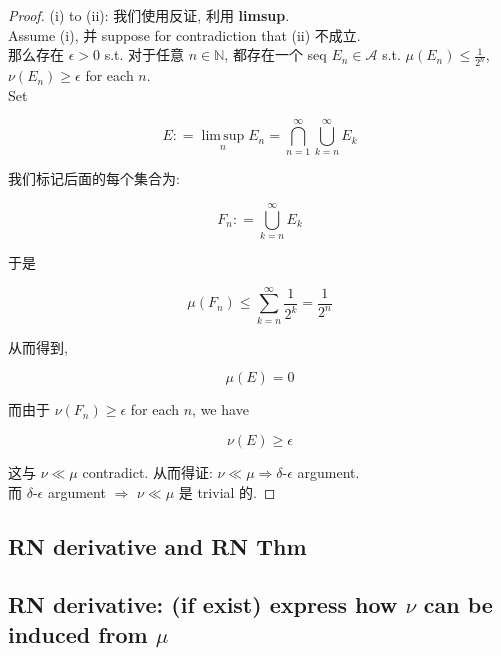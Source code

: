 \documentclass{qlnotes-export}
\begin{document}
\begin{proof}

(i) to (ii): 我们使用反证, 利用 \textbf{limsup}.\\
Assume (i), 并 suppose for contradiction that (ii) 不成立.\\
那么存在 \(\epsilon > 0\) s.t. 对于任意 \(n \in {\mathbb{N}}\), 都存在一个 seq \(E_{n} \in \mathcal{A}\) s.t. \(\mu(E_{n}) \leq \frac{1}{2^{n}}\), \(\nu(E_{n}) \geq \epsilon\) for each \(n\).\\
Set

\[E: = \operatorname{lim\, sup}\limits_{n}E_{n} = \bigcap\limits_{n = 1}^{\infty}\bigcup\limits_{k = n}^{\infty}E_{k}\]

我们标记后面的每个集合为:

\[F_{n}: = \bigcup\limits_{k = n}^{\infty}E_{k}\]

于是

\[\mu(F_{n}) \leq \sum\limits_{k = n}^{\infty}\frac{1}{2^{k}} = \frac{1}{2^{n}}\]

从而得到,

\[\mu(E) = 0\]

而由于 \(\nu(F_{n}) \geq \epsilon\) for each \(n\), we have

\[\nu(E) \geq \epsilon\]

这与 \(\nu \ll \mu\) contradict. 从而得证: \(\nu \ll \mu\Longrightarrow\delta\)-\(\epsilon\) argument.\\
而 \(\delta\)-\(\epsilon\) argument \(\Longrightarrow\) \(\nu \ll \mu\) 是 trivial 的.

\end{proof}

\subsection{RN derivative and RN Thm}\label{rn-derivative-and-rn-thm}

\subsection{\texorpdfstring{RN derivative: (if exist) express how \(\nu\) can be induced from \(\mu\)}{RN derivative: (if exist) express how \textbackslash nu can be induced from \textbackslash mu}}\label{rn-derivative-if-exist-express-how-nu-can-be-induced-from-mu}
\end{document}
